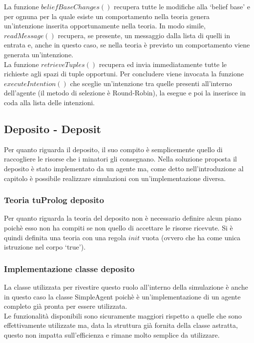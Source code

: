 La funzione $beliefBaseChanges()$ recupera tutte le modifiche alla `belief base' e per ognuna per la quale esiste un comportamento nella teoria genera un'intenzione inserita opportunamente nella teoria. In modo simile, $readMessage()$ recupera, se presente, un messaggio dalla lista di quelli in entrata e, anche in questo caso, se nella teoria è previsto un comportamento viene generata un'intenzione.
\\
La funzione $retrieveTuples()$ recupera ed invia immediatamente tutte le richieste agli spazi di tuple opportuni.
Per concludere viene invocata la funzione $executeIntention()$ che sceglie un'intenzione tra quelle presenti all'interno dell'agente (il metodo di selezione è Round-Robin), la esegue e poi la inserisce in coda alla lista delle intenzioni.

\subsection{Deposito - Deposit}
Per quanto riguarda il deposito, il suo compito è semplicemente quello di raccogliere le risorse che i minatori gli consegnano.
Nella soluzione proposta il deposito è stato implementato da un agente ma, come detto nell'introduzione al capitolo è possibile realizzare simulazioni con un'implementazione diversa.

\subsubsection{Teoria tuProlog deposito}
Per quanto riguarda la teoria del deposito non è necessario definire alcun piano poichè esso non ha compiti se non quello di accettare le risorse ricevute. Si è quindi definita una teoria con una regola $init$ vuota (ovvero che ha come unica istruzione nel corpo `true').

\subsubsection{Implementazione classe deposito}
La classe utilizzata per rivestire questo ruolo all'interno della simulazione è anche in questo caso la classe SimpleAgent poichè è un'implementazione di un agente completo già pronta per essere utilizzata.
\\
Le funzionalità disponibili sono sicuramente maggiori rispetto a quelle che sono effettivamente utilizzate ma, data la struttura già fornita della classe astratta, questo non impatta sull'efficienza e rimane molto semplice da utilizzare.

